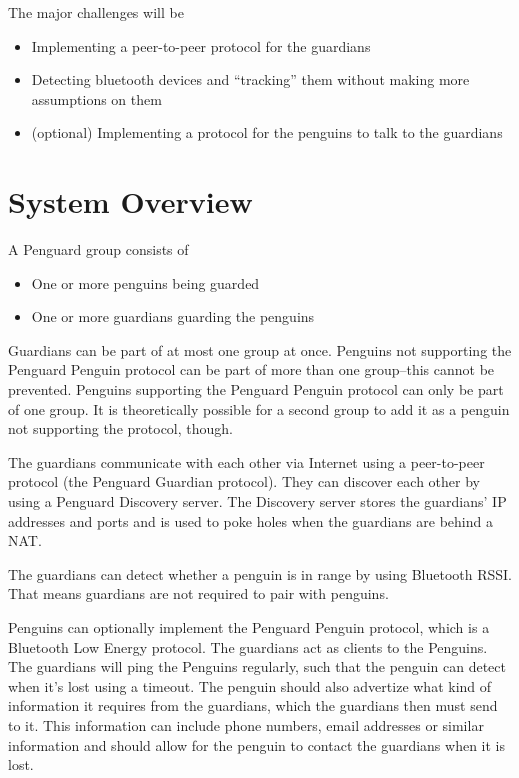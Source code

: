 \documentclass{report}
\begin{document}
The major challenges will be

\begin{itemize}
    \item Implementing a peer-to-peer protocol for the guardians
    \item Detecting bluetooth devices and ``tracking'' them without making more assumptions on them
    \item (optional) Implementing a protocol for the penguins to talk to the guardians
\end{itemize}

\section{System Overview}

A Penguard group consists of

\begin{itemize}
    \item One or more penguins being guarded
    \item One or more guardians guarding the penguins
\end{itemize}

Guardians can be part of at most one group at once. Penguins not supporting the Penguard Penguin protocol can be part of more than one group--this cannot be prevented. Penguins supporting the Penguard Penguin protocol can only be part of one group. It is theoretically possible for a second group to add it as a penguin not supporting the protocol, though.

The guardians communicate with each other via Internet using a peer-to-peer protocol (the Penguard Guardian protocol). They can discover each other by using a Penguard Discovery server. The Discovery server stores the guardians' IP addresses and ports and is used to poke holes when the guardians are behind a NAT.

The guardians can detect whether a penguin is in range by using Bluetooth RSSI. That means guardians are not required to pair with penguins. 

Penguins can optionally implement the Penguard Penguin protocol, which is a Bluetooth Low Energy protocol. The guardians act as clients to the Penguins. The guardians will ping the Penguins regularly, such that the penguin can detect when it's lost using a timeout. The penguin should also advertize what kind of information it requires from the guardians, which the guardians then must send to it. This information can include phone numbers, email addresses or similar information and should allow for the penguin to contact the guardians when it is lost.
\end{document}
